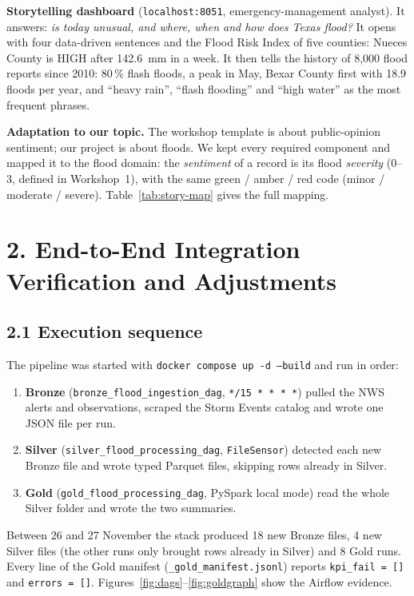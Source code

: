 \documentclass[stu, 12pt, letterpaper, donotrepeattitle, floatsintext, natbib]{apa7}
\begin{document}
\textbf{Storytelling dashboard} (\texttt{localhost:8051}, emergency-management analyst). It answers: \emph{is today unusual, and where, when and how does Texas flood?} It opens with four data-driven sentences and the Flood Risk Index of five counties: Nueces County is HIGH after 142.6~mm in a week. It then tells the history of 8,000 flood reports since 2010: 80\,\% flash floods, a peak in May, Bexar County first with 18.9 floods per year, and ``heavy rain'', ``flash flooding'' and ``high water'' as the most frequent phrases.

\textbf{Adaptation to our topic.} The workshop template is about public-opinion sentiment; our project is about floods. We kept every required component and mapped it to the flood domain: the \emph{sentiment} of a record is its flood \emph{severity} (0--3, defined in Workshop~1), with the same green / amber / red code (minor / moderate / severe). Table~\ref{tab:story-map} gives the full mapping.

\section{\large 2. End-to-End Integration Verification and Adjustments}
\subsection{2.1 Execution sequence}
The pipeline was started with \texttt{docker compose up -d --build} and run in order:
\begin{enumerate}
    \item \textbf{Bronze} (\texttt{bronze\_flood\_ingestion\_dag}, \texttt{*/15 * * * *}) pulled the NWS alerts and observations, scraped the Storm Events catalog and wrote one JSON file per run.
    \item \textbf{Silver} (\texttt{silver\_flood\_processing\_dag}, \texttt{FileSensor}) detected each new Bronze file and wrote typed Parquet files, skipping rows already in Silver.
    \item \textbf{Gold} (\texttt{gold\_flood\_processing\_dag}, PySpark local mode) read the whole Silver folder and wrote the two summaries.
\end{enumerate}
Between 26 and 27 November the stack produced 18 new Bronze files, 4 new Silver files (the other runs only brought rows already in Silver) and 8 Gold runs. Every line of the Gold manifest (\texttt{\_gold\_manifest.jsonl}) reports \texttt{kpi\_fail = []} and \texttt{errors = []}. Figures~\ref{fig:dags}--\ref{fig:goldgraph} show the Airflow evidence.
\end{document}
